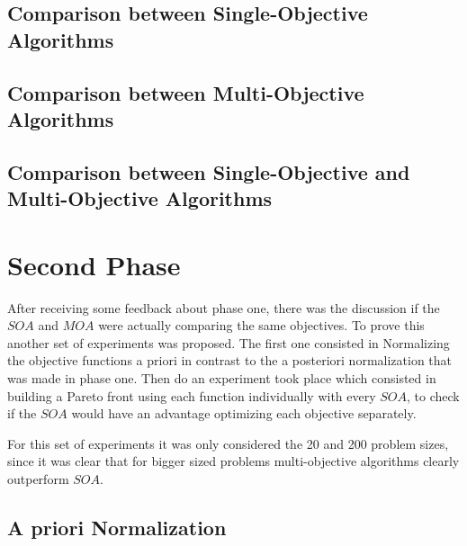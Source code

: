 \subsection{Comparison between Single-Objective Algorithms}

\subsection{Comparison between Multi-Objective Algorithms}

\subsection{Comparison between Single-Objective and Multi-Objective Algorithms}


\section{Second Phase}

After receiving some feedback about phase one, there was the discussion if the $SOA$ and $MOA$ were actually comparing the same objectives. To prove this another set of experiments was proposed. The first one consisted in Normalizing the objective functions a priori in contrast to the a posteriori normalization that was made in phase one. Then do an experiment took place which consisted in building a Pareto front using each function individually with every $SOA$, to check if the $SOA$ would have an advantage optimizing each objective separately. 

For this set of experiments it was only considered the 20 and 200 problem sizes, since it was clear that for bigger sized problems multi-objective algorithms clearly outperform $SOA$.

\subsection{A priori Normalization}

